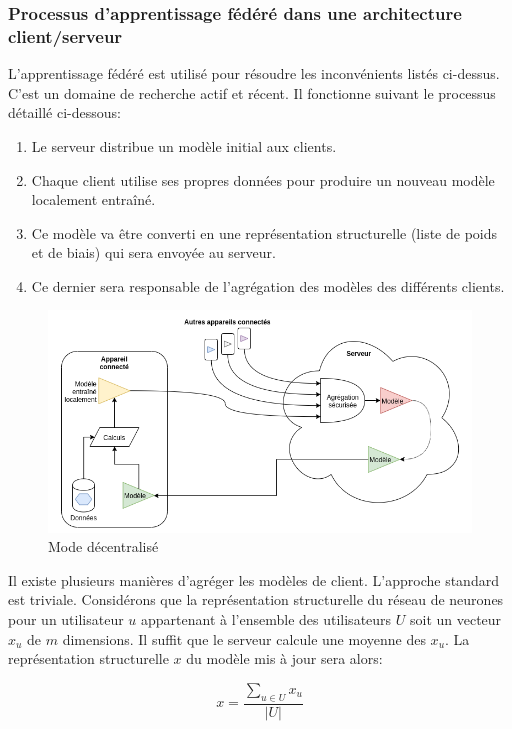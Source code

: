 \documentclass{article}
\begin{document}
\subsubsection{Processus d'apprentissage fédéré dans une architecture client/serveur}

L'apprentissage fédéré est utilisé pour résoudre les inconvénients listés ci-dessus. C'est un domaine de recherche actif et récent. Il fonctionne suivant le processus détaillé ci-dessous:

\begin{enumerate}
    \item Le serveur distribue un modèle initial aux clients.
    \item Chaque client utilise ses propres données pour produire un nouveau modèle localement entraîné.
    \item Ce modèle va être converti en une représentation structurelle (liste de poids et de biais) qui sera envoyée au serveur.
    \item Ce dernier sera responsable de l'agrégation des modèles des différents clients.
\end{enumerate}

    \begin{figure}[H]
    \includegraphics[width=\textwidth]{img/decentralize.png}
    \caption{Mode décentralisé}
    \end{figure}
    
Il existe plusieurs manières d'agréger les modèles de client. L’approche standard est triviale. Considérons que la représentation structurelle du réseau de neurones pour un utilisateur $u$ appartenant à l'ensemble des utilisateurs $U$ soit un vecteur $x_{u}$ de $m$ dimensions. Il suffit que le serveur calcule une moyenne des $x_{u}$. La représentation structurelle $x$ du modèle mis à jour sera alors:

\[
   x = \frac{{}\sum_{u\in U}x_{u}}{|U|}
\]
\end{document}
